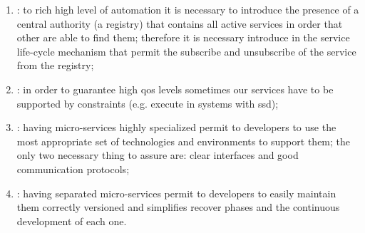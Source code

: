 \begin{enumerate}
{		to understand their internal business logic; furthermore it makes it easy to debug and maintain
		the code;}
	\item{: to rich high level of
		automation it is necessary to introduce the presence of a central authority (a registry) that
		contains all active services in order that other are able to find them; therefore it is necessary
		introduce in the service life-cycle mechanism that permit the subscribe and unsubscribe of
		the service from the registry;}
	\item{: in order to guarantee high \ac{qos}
		levels sometimes our services have to be supported by constraints (e.g. execute in systems with
		\ac{ssd});}
	\item{: having micro-services highly specialized permit
		to developers to use the most appropriate set of technologies and environments to support them;
		the only two necessary thing to assure are: clear interfaces and good communication protocols;}
	\item{: having separated micro-services
		permit to developers to easily maintain them correctly versioned and simplifies recover phases
		and the continuous development of each one.}
\end{enumerate}